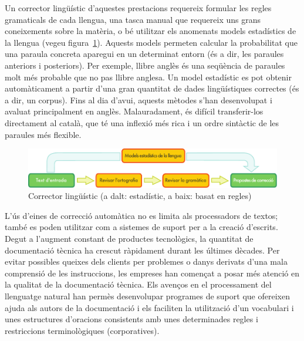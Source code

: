 \begin{multicols}{2}
Un corrector lingüístic d'aquestes prestacions requereix formular les regles gramaticals de cada llengua, una tasca manual que requereix uns grans coneixements sobre la matèria, o bé utilitzar els anomenats models estadístics de la llengua (vegeu figura~\ref{fig:langcheckingaarch_ca}). Aquests models permeten calcular la probabilitat que una paraula concreta aparegui en un determinat entorn (és a dir, les paraules anteriors i posteriors). Per exemple, llibre anglès és una seqüència de paraules molt més probable que no pas llibre anglesa. Un model estadístic es pot obtenir automàticament a partir d’una gran quantitat de dades lingüístiques correctes (és a dir, un corpus). Fins al dia d’avui, aquests mètodes s’han desenvolupat i avaluat principalment en anglès. Malauradament, és difícil transferir-los directament al català, que té una inflexió més rica i un ordre sintàctic de les paraules més flexible.

\begin{figure}[htb]
  \center
  \includegraphics[width=\textwidth]{../_media/catalan/language_checking}
  \caption{Corrector lingüístic (a dalt: estadístic, a baix: basat en regles)}
  \label{fig:langcheckingaarch_ca}
\end{figure}

L’ús d’eines de correcció automàtica no es limita als processadors de textos; també es poden utilitzar com a sistemes de suport per a la creació d’escrits. Degut a l’augment constant de productes tecnològics, la quantitat de documentació tècnica ha crescut ràpidament durant les últimes dècades. Per evitar possibles queixes dels clients per problemes o danys derivats d’una mala comprensió de les instruccions, les empreses han començat a posar més atenció en la qualitat de la documentació tècnica. Els avenços en el processament del llenguatge natural han permès desenvolupar programes de suport que ofereixen ajuda als autors de la documentació i els faciliten la utilització d’un vocabulari i unes estructures d’oracions consistents amb unes determinades regles i restriccions terminològiques (corporatives).



\end{multicols}
